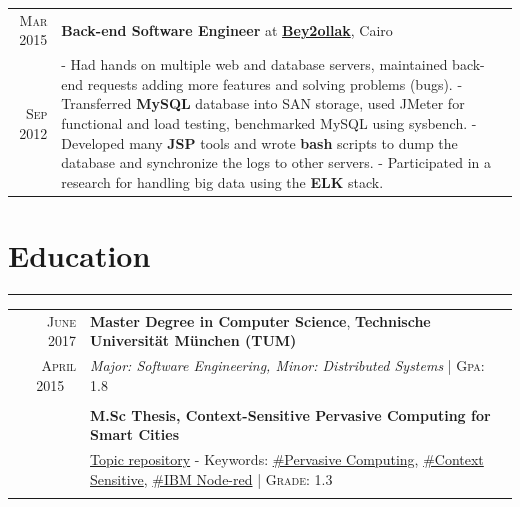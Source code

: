 \documentclass[a4paper,13pt]{article}
\begin{document}
\begin{adjustwidth}{-3cm}{}
\begin{tabular}{r|p{17.5cm}}

\textsc{Mar 2015} & \textbf{Back-end Software Engineer} at \href{http://desktop.bey2ollak.com/features-mentions/}{\textbf{Bey2ollak}}, Cairo \\
\textsc{Sep 2012} & 

\footnotesize{
	- Had hands on multiple web and database servers, maintained back-end requests adding more features and solving problems (bugs).\newline 
	- Transferred \textbf{MySQL} database into SAN storage, used JMeter for functional and load testing, benchmarked MySQL using sysbench.\newline
	- Developed many \textbf{JSP} tools and wrote \textbf{bash} scripts to dump the database and synchronize the logs to other servers.\newline
	- Participated in a research for handling big data using the \textbf{ELK} stack.
}
\end{tabular}





\section{Education}
\rule[0pt]{20cm}{0.5pt}

\begin{tabular}{r|p{17.5cm}}
		

\textsc{June 2017} & \textbf{Master Degree in Computer Science}, \textbf{Technische Universität München (TUM)} \\ \textsc{April} 2015 \
& \small\emph{Major: Software Engineering, Minor: Distributed Systems}
 \normalsize\footnotesize \hfill| \normalsize \textsc{Gpa}: 1.8
\\ \multicolumn{2}{c}{} \\

\textsc{}&
\textbf{M.Sc Thesis, Context-Sensitive Pervasive Computing for Smart Cities}\\
& \href{https://github.com/SalehAly/master-thesis}{Topic repository} - Keywords: \href{https://www.google.de/search?q=Pervasive+Computing}{\#Pervasive Computing}, \href{https://www.google.de/search?q=context+sensitive}{\#Context Sensitive}, \href{nodered.org}{\#IBM Node-red} 
\footnotesize \hfill| \normalsize \textsc{Grade}: 1.3
\\ \multicolumn{2}{c}{} \\



\end{tabular}
\end{adjustwidth}
\end{document}
